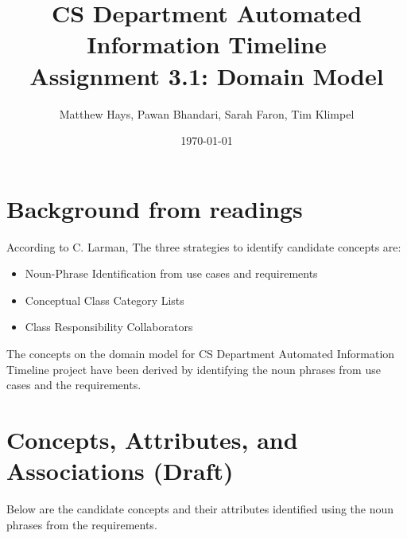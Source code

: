 \documentclass{article}
\title{CS Department Automated Information Timeline \\ Assignment 3.1: Domain Model}
\date{\today}
\author{Matthew Hays, Pawan Bhandari, Sarah Faron, Tim Klimpel}
\begin{document}
\maketitle
\newpage
\tableofcontents
\listoffigures
\newpage

\section{Background from readings}
According to C. Larman, The three strategies to identify candidate concepts are:
\begin{itemize}
    \item Noun-Phrase Identification from use cases and requirements
    \item Conceptual Class Category Lists
    \item Class Responsibility Collaborators
\end{itemize}
The concepts on the domain model for CS Department Automated Information Timeline project have been derived by identifying the noun phrases from use cases and the requirements.

\section{Concepts, Attributes, and Associations (Draft)}
Below are the candidate concepts and their attributes identified using the noun phrases from the requirements.
\end{document}
